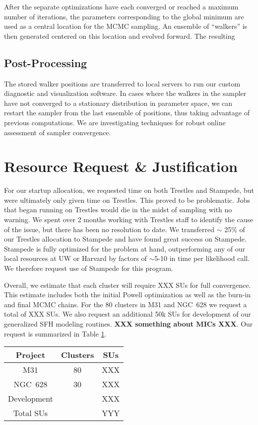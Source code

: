 \documentclass[11pt,preprint]{aastex}
\begin{document}
After the separate optimizations have each converged or reached a maximum number of iterations, the parameters corresponding to the global minimum are used as a central location for the MCMC sampling.
An ensemble of ``walkers'' is then generated centered on this location and evolved forward.  
The resulting 

\subsection{Post-Processing}
The stored walker positions are transferred to local servers to run our custom diagnostic and visualization software.  
In cases where the walkers in the sampler have not converged to a stationary distribution in parameter space, we can restart the sampler from the last ensemble of positions, thus taking advantage of previous computations.  
We are investigating techniques for robust online assessment of sampler convergence.


\section{Resource Request \& Justification}

For our startup allocation, we requested time on both Trestles and Stampede, but were ultimately only given time on Trestles.  This proved to be problematic.  Jobs that began running on Trestles would die in the midst of sampling with no warning.  We spent over 2 months working with Trestles staff to identify the cause of the issue, but there has been no resolution to date.  We transferred $\sim$ 25\% of our Trestles allocation to Stampede and have found great success on Stampede.  Stampede is fully optimized for the problem at hand, outperforming any of our local resources at UW or Harvard by factors of $\sim$5-10 in time per likelihood call.  We therefore request use of Stampede for this program.

Overall, we estimate that each cluster will require XXX SUs for full convergence.  This estimate includes both the initial Powell optimization as well as the burn-in and final MCMC chains.  For the 80 clusters in M31 and NGC~628 we request a total of XXX SUs.  We also request an additional 50k SUs for development of our generalized SFH modeling routines.  \textbf{XXX something about MICs XXX}.  Our request is summarized in Table \ref{tab1}.

\begin{table}[h!]
\begin{center}
\begin{tabular}{cc|c}
Project & Clusters & SUs \\
\hline
M31 & 80 & XXX \\
NGC~628 & 30 & XXX \\
Development & & XXX \\
\hline Total SUs & & YYY \\
\hline

\end{tabular}
\end{center}
\label{tab1}
\end{table}%
\end{document}
